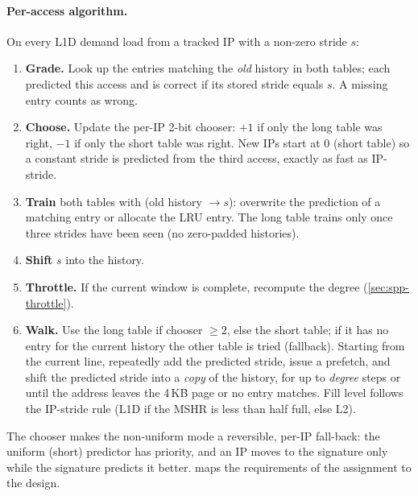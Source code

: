 \documentclass[11pt,a4paper]{article}
\theoremstyle{themethm}
\theoremstyle{themedef}
\theoremstyle{themeex}
\theoremstyle{themerem}
\begin{document}
\paragraph{Per-access algorithm.} On every L1D demand load from a tracked IP
with a non-zero stride $s$:
\begin{enumerate}[nosep]
  \item \textbf{Grade.} Look up the entries matching the \emph{old} history in
        both tables; each predicted this access and is correct if its stored
        stride equals $s$. A missing entry counts as wrong.
  \item \textbf{Choose.} Update the per-IP 2-bit chooser: $+1$ if only the long
        table was right, $-1$ if only the short table was right. New IPs start
        at 0 (short table) so a constant stride is predicted from the third
        access, exactly as fast as IP-stride.
  \item \textbf{Train} both tables with (old history $\to s$): overwrite the
        prediction of a matching entry or allocate the LRU entry. The long
        table trains only once three strides have been seen (no zero-padded
        histories).
  \item \textbf{Shift} $s$ into the history.
  \item \textbf{Throttle.} If the current window is complete, recompute the degree (\cref{sec:spp-throttle}).
  \item \textbf{Walk.} Use the long table if chooser $\ge 2$, else the short
        table; if it has no entry for the current history the other table is
        tried (fallback). Starting from the current line, repeatedly add the
        predicted stride, issue a prefetch, and shift the predicted stride into
        a \emph{copy} of the history, for up to \emph{degree} steps or until the
        address leaves the 4\,KB page or no entry matches. Fill level follows
        the IP-stride rule (L1D if the MSHR is less than half full, else L2).
\end{enumerate}
The chooser makes the non-uniform mode a reversible, per-IP fall-back: the
uniform (short) predictor has priority, and an IP moves to the signature only
while the signature predicts it better.  maps the
requirements of the assignment to the design.
\end{document}
